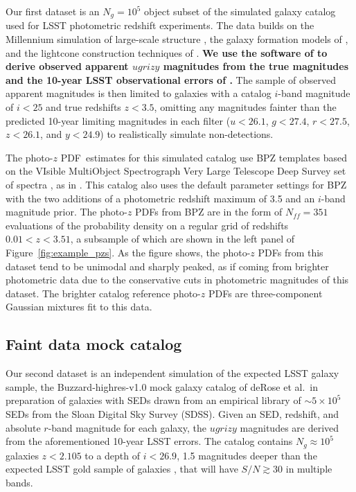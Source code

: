 \documentclass[\docopts]{\docclass}
\newcommand{\pz}{photo-$z$ PDF}
\newcommand{\Ssdata}{Faint\xspace}
\begin{document}
Our first dataset is an $N_{g} = 10^{5}$ object subset of the 
\citet{graham_photometric_2017} simulated galaxy catalog used for LSST 
photometric redshift experiments.
The data builds on the Millennium simulation of large-scale structure 
\citep{springel_simulations_2005}, the galaxy formation models of 
\citet{gonzalez-perez_how_2014}, and the lightcone construction techniques of 
\citet{merson_lightcone_2013}.
\textbf{We use the software of \citet{connolly_end--end_2014} to derive 
observed apparent $ugrizy$ magnitudes from the true magnitudes and the 10-year 
LSST observational errors of \citet{ivezic_lsst:_2008}.}
The sample of observed apparent magnitudes is then limited to galaxies with a 
catalog $i$-band magnitude of $i<25$ and true redshifts $z<3.5$, omitting any 
magnitudes fainter than the predicted 10-year limiting magnitudes in each 
filter ($u<26.1$, $g<27.4$, $r<27.5$, $z<26.1$, and $y<24.9$) to realistically 
simulate non-detections.

The \pz\ estimates for this simulated catalog use BPZ templates based on the 
VIsible MultiObject Spectrograph Very Large Telescope Deep Survey set of 
spectra \citep{fevre_vimos_2005}, as in \citet{ilbert_accurate_2006}.
This catalog also uses the default parameter settings for BPZ with the two 
additions of a photometric redshift maximum of 3.5 and an $i$-band magnitude 
prior.
The \pz s from BPZ are in the form of $N_{ff} = 351$ evaluations of the 
probability density on a regular grid of redshifts $0.01 < z < 3.51$, a 
subsample of which are shown in the left panel of Figure~\ref{fig:example_pzs}.
As the figure shows, the \pz s from this dataset tend to be unimodal and 
sharply peaked, as if coming from brighter photometric data due to the 
conservative cuts in photometric magnitudes of this dataset.
The brighter catalog reference \pz s are three-component Gaussian mixtures fit 
to this data.

\subsection{\Ssdata data mock catalog}
\label{sec:schmidt}

Our second dataset is an independent simulation of the expected LSST galaxy 
sample, the Buzzard-highres-v1.0 mock galaxy catalog of deRose et al.\ in 
preparation of galaxies with SEDs drawn from an empirical library of 
$\sim5\times10^{5}$ SEDs from the Sloan Digital Sky Survey (SDSS).
Given an SED, redshift, and absolute $r$-band magnitude for each galaxy, the 
$ugrizy$ magnitudes are derived from the aforementioned 10-year LSST errors.
The catalog contains $N_{g} \approx 10^{5}$ galaxies $z<2.105$ to a depth of 
$i<26.9$, 1.5 magnitudes deeper than the expected LSST gold sample of galaxies 
\citep{ScienceBook}, that will have $S/N \gtrsim 30$ in multiple bands.
\end{document}
